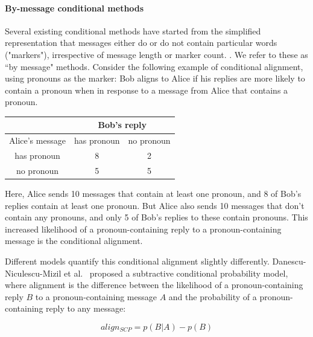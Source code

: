 \documentclass[11pt]{article}
\begin{document}

\paragraph{By-message conditional methods} Several existing conditional methods have started from the simplified representation that messages either do or do not contain particular words ("markers"), irrespective of message length or marker count. \cite{DNMEtAl2012,DoyleYurovskyFrank2016}. We refer to these as ``by message" methods. Consider the following example of conditional alignment, using pronouns as the marker: Bob aligns to Alice if his replies are more likely to contain a pronoun when in response to a message from Alice that contains a pronoun.

\begin{center}
\begin{tabular}{|c||c|c|}
\hline
& \multicolumn{2}{|c|}{Bob's reply} \\
\hline
Alice's message & has pronoun & no pronoun \\ \hline
has pronoun & 8 & 2\\
no pronoun & 5 & 5\\
\hline
\end{tabular}
\end{center}

Here, Alice sends 10 messages that contain at least one pronoun, and 8 of Bob's replies contain at least one pronoun.  But Alice also sends 10 messages that don't contain any pronouns, and only 5 of Bob's replies to these contain pronouns. This increased likelihood of a pronoun-containing reply to a pronoun-containing message is the conditional alignment.

Different models quantify this conditional alignment slightly differently.  Danescu-Niculescu-Mizil et al.~ proposed a subtractive conditional probability model, where alignment is the difference between the likelihood of a pronoun-containing reply $B$ to a pronoun-containing message $A$ and the probability of a pronoun-containing reply to any message:\vspace*{-5pt}

\begin{equation}
align_{SCP} = p(B|A) - p(B)
\end{equation}
\end{document}
